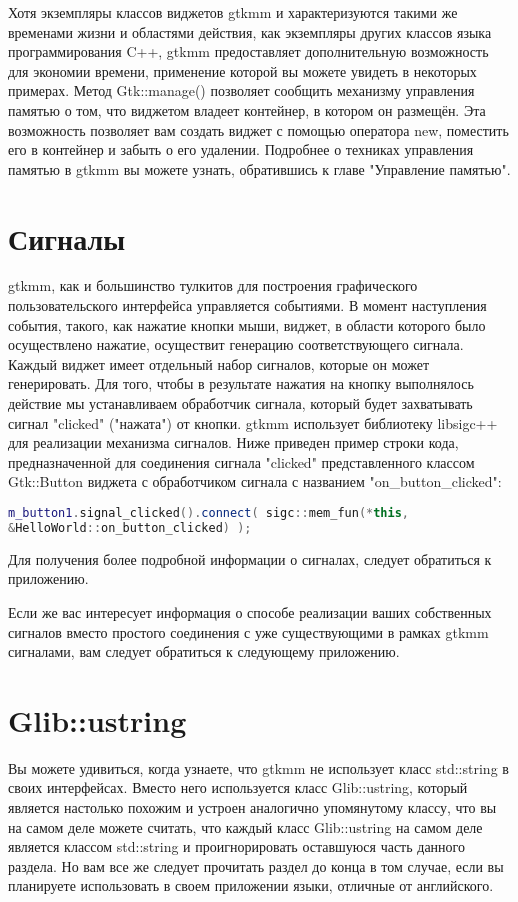 Хотя экземпляры классов виджетов gtkmm и характеризуются такими же временами жизни и областями действия, как экземпляры других классов языка программирования C++, gtkmm предоставляет дополнительную возможность для экономии времени, применение которой вы можете увидеть в некоторых примерах. Метод Gtk::manage() позволяет сообщить механизму управления памятью о том, что виджетом владеет контейнер, в котором он размещён. Эта возможность позволяет вам создать виджет с помощью оператора new, поместить его в контейнер и забыть о его удалении. Подробнее о техниках управления памятью в gtkmm вы можете узнать, обратившись к главе "Управление памятью". 

\section{Сигналы}
 gtkmm, как и большинство тулкитов для построения графического пользовательского интерфейса управляется событиями. В момент наступления события, такого, как нажатие кнопки мыши, виджет, в области которого было осуществлено нажатие, осуществит генерацию соответствующего сигнала. Каждый виджет имеет отдельный набор сигналов, которые он может генерировать. Для того, чтобы в результате нажатия на кнопку выполнялось действие мы устанавливаем обработчик сигнала, который будет захватывать сигнал "clicked" ("нажата") от кнопки.
gtkmm использует библиотеку libsigc++ для реализации механизма сигналов. Ниже приведен пример строки кода, предназначенной для соединения сигнала "clicked" представленного классом Gtk::Button виджета с обработчиком сигнала с названием "on\_button\_clicked":
\begin{lstlisting}[language=C++]
m_button1.signal_clicked().connect( sigc::mem_fun(*this,
&HelloWorld::on_button_clicked) );
\end{lstlisting}

Для получения более подробной информации о сигналах, следует обратиться к приложению.

Если же вас интересует информация о способе реализации ваших собственных сигналов вместо простого соединения с уже существующими в рамках gtkmm сигналами, вам следует обратиться к следующему приложению. 
\section{Glib::ustring}
 Вы можете удивиться, когда узнаете, что gtkmm не использует класс std::string в своих интерфейсах. Вместо него используется класс Glib::ustring, который является настолько похожим и устроен аналогично упомянутому классу, что вы на самом деле можете считать, что каждый класс Glib::ustring на самом деле является классом std::string и проигнорировать оставшуюся часть данного раздела. Но вам все же следует прочитать раздел до конца в том случае, если вы планируете использовать в своем приложении языки, отличные от английского.


